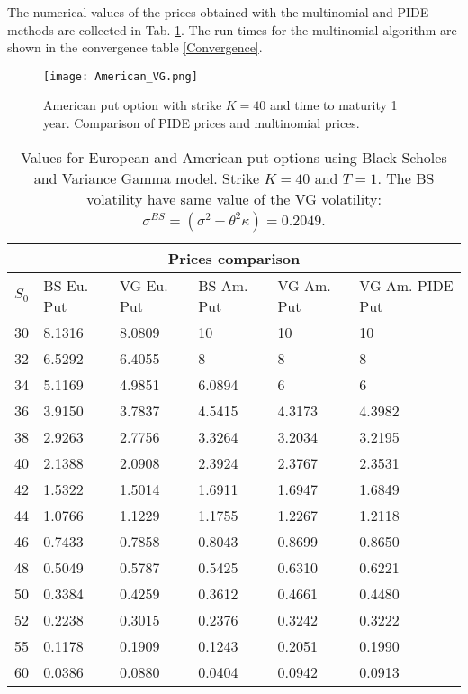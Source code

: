 The numerical values of the prices obtained with the multinomial and PIDE methods are collected in Tab. \ref{Option_values3}.
The run times for the multinomial algorithm are shown in the convergence table \ref{Convergence}.
\begin{figure}[ht!]
 \centering
 \texttt{[image: American\_VG.png]}
 \caption{American put option with strike $K=40$ and time to maturity 1 year. Comparison of PIDE prices and multinomial prices.}
 \label{AmVG}
\end{figure}
\begin{table}[ht]
{\begin{tabular}{llllll}
\toprule
 \multicolumn{6}{c}{Prices comparison} \\
\midrule
$S_0$ & BS Eu. Put & VG Eu. Put & BS Am. Put & VG Am. Put & VG Am. PIDE Put \\
 \midrule
  30 & 8.1316 & 8.0809 & 10     & 10     & 10 \\
  32 & 6.5292 & 6.4055 & 8      & 8      & 8 \\
  34 & 5.1169 & 4.9851 & 6.0894 & 6      & 6 \\
  36 & 3.9150 & 3.7837 & 4.5415 & 4.3173 & 4.3982 \\
  38 & 2.9263 & 2.7756 & 3.3264 & 3.2034 & 3.2195 \\
  40 & 2.1388 & 2.0908 & 2.3924 & 2.3767 & 2.3531 \\
  42 & 1.5322 & 1.5014 & 1.6911 & 1.6947 & 1.6849 \\
  44 & 1.0766 & 1.1229 & 1.1755 & 1.2267 & 1.2118 \\
  46 & 0.7433 & 0.7858 & 0.8043 & 0.8699 & 0.8650 \\
  48 & 0.5049 & 0.5787 & 0.5425 & 0.6310 & 0.6221 \\
  50 & 0.3384 & 0.4259 & 0.3612 & 0.4661 & 0.4480 \\ 
  52 & 0.2238 & 0.3015 & 0.2376 & 0.3242 & 0.3222 \\
  55 & 0.1178 & 0.1909 & 0.1243 & 0.2051 & 0.1990 \\
  60 & 0.0386 & 0.0880 & 0.0404 & 0.0942 & 0.0913 \\ 
 \bottomrule
 \end{tabular}}
  \label{Option_values3}
  \caption{Values for European and American put options using Black-Scholes and Variance Gamma model. Strike $K=40$ and $T=1$. The BS volatility have same value of the VG volatility:  
  $ \sigma^{BS} = (\sigma^2 + \theta^2 \kappa) = 0.2049$. }
\end{table}

